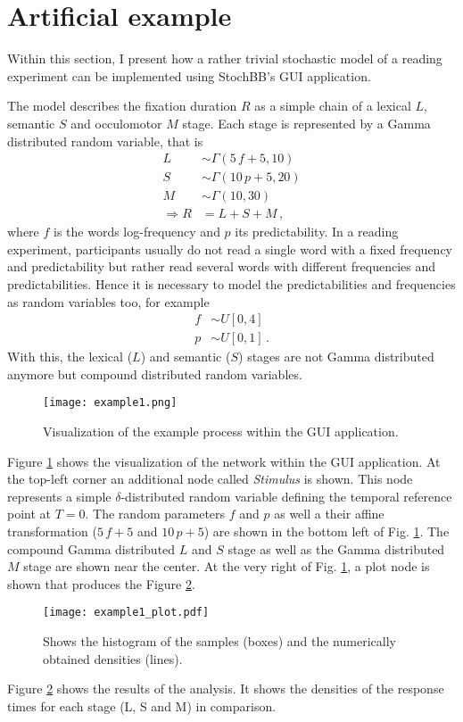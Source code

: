 \section{Artificial example} \label{sec:example}
Within this section, I present how a rather trivial stochastic model of a reading experiment can be
implemented using StochBB's GUI application.

The model describes the fixation duration $R$ as a simple chain of a lexical $L$, semantic $S$ and
occulomotor $M$ stage. Each stage is represented by a Gamma distributed random variable, that is
\begin{align*}
 L &\sim \Gamma(5\,f+5, 10)\\
 S &\sim \Gamma(10\,p+5, 20)\\
 M &\sim \Gamma(10, 30)\\
 \Rightarrow R &= L+S+M\,,
\end{align*} 
where $f$ is the words log-frequency and $p$ its predictability. In a reading experiment, 
participants usually do not read a single word with a fixed frequency and predictability but
rather read several words with different frequencies and predictabilities. Hence it is necessary
to model the predictabilities and frequencies as random variables too, for example
\begin{align*}
 f &\sim U[0,4]\\
 p &\sim U[0,1]\,.
\end{align*}
With this, the lexical ($L$) and semantic ($S$) stages are not Gamma distributed anymore but
compound distributed random variables. 

\begin{figure}[!ht]
 \centering
  \texttt{[image: example1.png]}
  \caption{Visualization of the example process within the  GUI application.} \label{fig:exgraph}
\end{figure}

Figure \ref{fig:exgraph} shows the visualization of the network within the  GUI application. At the top-left corner an additional node called \emph{Stimulus} is shown. This node represents a simple $\delta$-distributed random variable defining the temporal reference point at $T=0$. The random parameters $f$ and $p$ as well a their affine transformation ($5\,f+5$ and $10\,p+5$) are shown in the bottom left of Fig. \ref{fig:exgraph}. The compound Gamma distributed $L$ and $S$ stage as well as the Gamma distributed $M$ stage are shown near the center. At the very right of Fig. \ref{fig:exgraph}, a plot node is shown that produces the Figure \ref{fig:example}.

\begin{figure}[!ht]
 \centering
 \texttt{[image: example1\_plot.pdf]}
 \caption{Shows the histogram of the samples (boxes) and the numerically obtained densities (lines).} \label{fig:example}
\end{figure}	

Figure \ref{fig:example} shows the results of the analysis. It shows the densities of the response times for each stage (L, S and M) in comparison. 
